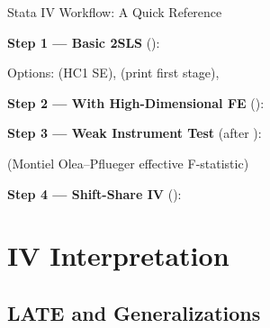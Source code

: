 \documentclass{beamer}
\begin{document}
\begin{frame}{Stata IV Workflow: A Quick Reference}
\vspace{-0.2cm}
{\small
\textbf{Step 1 --- Basic 2SLS} ():\smallskip

\hspace{1em}

\vspace{-0.2cm}
Options:  (HC1 SE),  (print first stage), \medskip

\textbf{Step 2 --- With High-Dimensional FE} ():\smallskip

\hspace{1em}\medskip

\textbf{Step 3 --- Weak Instrument Test} (after ):\smallskip

\hspace{1em}\quad (Montiel Olea--Pflueger effective F-statistic)\medskip

\textbf{Step 4 --- Shift-Share IV} ():\smallskip

\hspace{1em}

\hspace{1em}
}
\end{frame}

\section{IV Interpretation}

\subsection{LATE and Generalizations}
\end{document}
